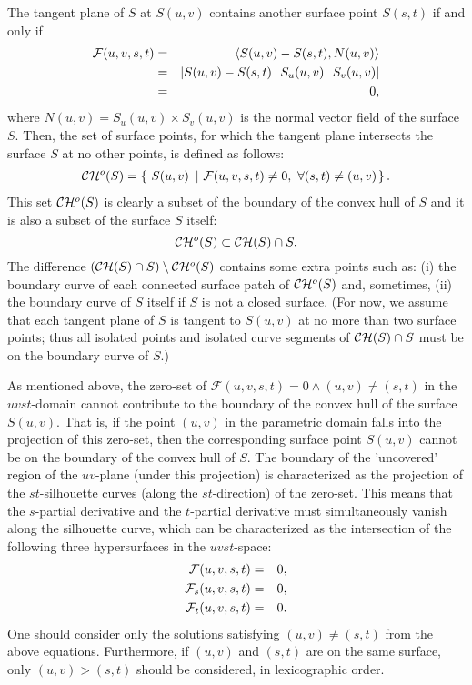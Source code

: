 \documentclass{elsart}
\begin{document}
The tangent plane of $S$ at $S(u,v)$ contains
another surface point $S(s,t)$ if and only if 
\begin{eqnarray*}
   {\mathcal F}(u,v,s,t) &=& \inner{S(u,v)-S(s,t)}{N(u,v)}\\
   &=& |S(u,v)-S(s,t)\ \ S_u(u,v)\ \ S_v(u,v)|\\
   &=& 0,
\end{eqnarray*}
where $N(u,v) = S_u(u,v) \times S_v(u,v)$ is the normal vector field 
of the surface $S$. Then, the set of surface points, for which 
the tangent plane intersects the surface $S$ at no other points, 
is defined as follows:
\begin{eqnarray*}
\CH{}^o(S) = \left\{~S(u,v)~\left|~ 
{\cal F}(u,v,s,t) \neq 0,~\forall (s,t) \neq (u,v) \right. \right\}.
\end{eqnarray*}
This set $\CH{}^o(S)$ is clearly a subset of the boundary of the convex hull
of $S$ and it is also a subset of the surface $S$ itself:
\begin{equation}
    \CH{}^o(S) \subset \CH{}(S) \cap S.
\label{eqn-cho-ch}
\end{equation}
The difference $(\CH{}(S) \cap S) \setminus \CH{}^o(S)$ contains some extra
points such as: (i) the boundary curve of each connected surface patch of
$\CH{}^o(S)$ and, sometimes, (ii) the boundary curve of $S$ itself if $S$ is 
not a closed surface.  (For now, we assume that each tangent plane of $S$ is
tangent to $S(u,v)$ at no more than two surface points;
%
%
thus all isolated points and isolated curve segments of
$\CH{}(S) \cap S$ must be on the boundary curve of $S$.)

As mentioned above, the zero-set of 
${\mathcal F}(u,v,s,t) = 0 \wedge (u,v) \neq (s,t)$ in
the $uvst$-domain cannot contribute to the boundary of the convex hull
of the surface $S(u,v)$. That is, if the point $(u,v)$ in the parametric
domain falls into the projection of this zero-set, then the corresponding
surface point $S(u,v)$ cannot be on the boundary of the convex hull 
of $S$. The boundary of the 'uncovered' region of the $uv$-plane
(under this projection) is characterized as the projection of the 
$st$-silhouette curves (along the $st$-direction) of the zero-set. This means
that the $s$-partial derivative and the $t$-partial derivative must 
simultaneously vanish along the silhouette curve, which can be 
characterized as the
intersection of the following three hypersurfaces in the $uvst$-space:
\begin{eqnarray}
   {\cal F}(u,v,s,t) &=& 0, \label{eqn-f-uvst} \\
   {\cal F}_s(u,v,s,t) &=& 0, \label{eqn-s-partial}\\
   {\cal F}_t(u,v,s,t) &=& 0. \label{eqn-t-partial}
\end{eqnarray}
One should consider only the solutions satisfying $(u,v) \neq (s,t)$
from the above equations. Furthermore, if $(u,v)$ and $(s,t)$ are
on the same surface, only $(u,v) > (s,t)$ should be considered, in
lexicographic order.
\end{document}
